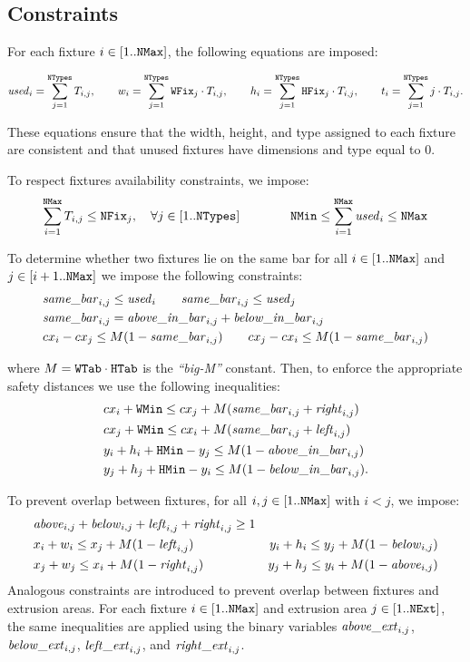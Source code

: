 \subsection{Constraints}
For each fixture \(i \in [1..\mathtt{NMax}]\), the following equations are imposed:

\[
\mathit{used}_i = \sum_{j=1}^{\mathtt{NTypes}} T_{i,j}, \qquad
w_i = \sum_{j=1}^{\mathtt{NTypes}} \mathtt{WFix}_j \cdot T_{i,j}, \qquad
h_i = \sum_{j=1}^{\mathtt{NTypes}} \mathtt{HFix}_j \cdot T_{i,j}, \qquad
t_i = \sum_{j=1}^{\mathtt{NTypes}} j \cdot T_{i,j}.
\]

These equations ensure that the width, height, and type assigned to each fixture are consistent and that unused fixtures have dimensions and type equal to \(0\).

To respect fixtures availability constraints, we impose:
\[
\sum_{i=1}^{\mathtt{NMax}} T_{i,j} \le \mathtt{NFix}_j, \quad \forall j \in [1..\mathtt{NTypes}] \qquad\qquad
\mathtt{NMin} \le \sum_{i=1}^{\mathtt{NMax}} \mathit{used}_i \le \mathtt{NMax}
\]

To determine whether two fixtures lie on the same bar for all \(i \in [1..\mathtt{NMax}]\) and \(j \in [i+1..\mathtt{NMax}]\) we impose the following constraints:
\[
\begin{aligned}
	&\mathit{same\_bar}_{i,j} \le \mathit{used}_i \qquad \mathit{same\_bar}_{i,j} \le \mathit{used}_j \\
	&\mathit{same\_bar}_{i,j} = \mathit{above\_in\_bar}_{i,j} + \mathit{below\_in\_bar}_{i,j}\\
	&cx_i - cx_j \le M (1 - \mathit{same\_bar}_{i,j}) \qquad cx_j - cx_i \le M (1 - \mathit{same\_bar}_{i,j}) \\
\end{aligned}
\]

where \(M = \mathtt{WTab} \cdot \mathtt{HTab}\) is the \emph{``big-M''} constant. Then, to enforce the appropriate safety distances we use the following inequalities:
\[
\begin{aligned}
	&cx_i + \mathtt{WMin} \le cx_j + M(\mathit{same\_bar}_{i,j} + \mathit{right}_{i,j}) \\
	&cx_j + \mathtt{WMin} \le cx_i + M(\mathit{same\_bar}_{i,j} + \mathit{left}_{i,j}) \\
	&y_i + h_i + \mathtt{HMin} - y_j \le M (1 - \mathit{above\_in\_bar}_{i,j}) \\
	&y_j + h_j + \mathtt{HMin} - y_i \le M (1 - \mathit{below\_in\_bar}_{i,j}).
\end{aligned}
\]

To prevent overlap between fixtures, for all \(i,j \in [1..\mathtt{NMax}]\) with \(i < j\), we impose:
\[
\begin{aligned}
	&\mathit{above}_{i,j} + \mathit{below}_{i,j} +
	\mathit{left}_{i,j} + \mathit{right}_{i,j} \ge 1 \\
	&x_i + w_i \le x_j + M (1 - \mathit{left}_{i,j}) \qquad
	&y_i + h_i \le y_j + M (1 - \mathit{below}_{i,j}) \\
	&x_j + w_j \le x_i + M (1 - \mathit{right}_{i,j}) \qquad
	&y_j + h_j \le y_i + M (1 - \mathit{above}_{i,j})
\end{aligned}
\]
Analogous constraints are introduced to prevent overlap between fixtures and extrusion areas. For each fixture \(i \in [1..\mathtt{NMax}]\) and extrusion area \(j \in [1..\mathtt{NExt}]\), the same inequalities are applied using the binary variables \(\mathit{above\_ext}_{i,j}\), \(\mathit{below\_ext}_{i,j}\), \(\mathit{left\_ext}_{i,j}\), and \(\mathit{right\_ext}_{i,j}\).

